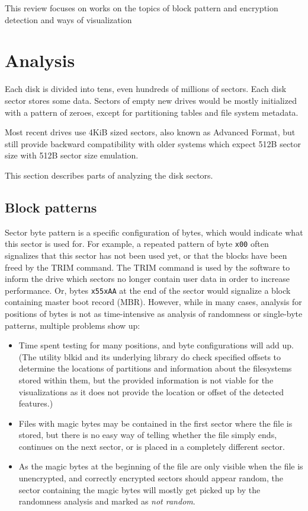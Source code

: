 \documentclass[
  digital, %
  color,   %
  oneside, %
  lof,     %
  nolot,     %
]{fithesis4}
\begin{document}
This review focuses on works on the topics of block pattern and encryption detection and ways of visualization

\section{Analysis}
\label{sec:analysis}

Each disk is divided into tens, even hundreds of millions of sectors.
Each disk sector stores some data.
Sectors of empty new drives would be mostly initialized with a pattern of zeroes, except for partitioning tables and file system metadata.

Most recent drives use 4KiB sized sectors, also known as Advanced Format, but still provide backward compatibility with older systems which expect 512B sector size with 512B sector size emulation. \cite{seagate} 

This section describes parts of analyzing the disk sectors.

\subsection{Block patterns}
\label{ssec:block-analysis}

Sector byte pattern is a specific configuration of bytes, which would indicate what this sector is used for.
For example, a repeated pattern of byte \texttt{x00} often signalizes that this sector has not been used yet, or that the blocks have been freed by the TRIM command.
The TRIM command is used by the software to inform the drive which sectors no longer contain user data in order to increase performance.\cite{mcmillen21}
Or, bytes \texttt{x55xAA} at the end of the sector would signalize a block containing master boot record (MBR).
However, while in many cases, analysis for positions of bytes is not as time-intensive as analysis of randomness or single-byte patterns, multiple problems show up:
\begin{itemize}
    \item Time spent testing for many positions, and byte configurations will add up.
    (The utility blkid \cite{blkid} and its underlying library \cite{libblkid} do check specified offsets to determine the locations of partitions and information about the filesystems stored within them, but the provided information is not viable for the visualizations as it does not provide the location or offset of the detected features.)
    \item Files with magic bytes may be contained in the first sector where the file is stored, but there is no easy way of telling whether the file simply ends, continues on the next sector, or is placed in a completely different sector.
    \item As the magic bytes at the beginning of the file are only visible when the file is unencrypted, and correctly encrypted sectors should appear random, the sector containing the magic bytes will mostly get picked up by the randomness analysis and marked as \emph{not random}. 
\end{itemize}
\end{document}
